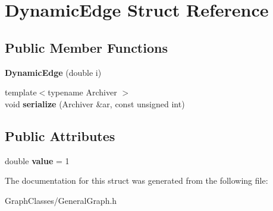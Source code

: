 \hypertarget{structDynamicEdge}{}\section{Dynamic\+Edge Struct Reference}
\label{structDynamicEdge}
\subsection*{Public Member Functions}
\begin{DoxyCompactItemize}
\item 
\mbox{\label{structDynamicEdge_ac6924c98f001d82ba565c9fedd2e3c87}} 
{\bfseries Dynamic\+Edge} (double i)
\item 
\mbox{\label{structDynamicEdge_a685fb1ed1035f87f7095f64a9746202f}} 
{\footnotesize template$<$typename Archiver $>$ }\\void {\bfseries serialize} (Archiver \&ar, const unsigned int)
\end{DoxyCompactItemize}
\subsection*{Public Attributes}
\begin{DoxyCompactItemize}
\item 
\mbox{\label{structDynamicEdge_a8131459b38901852752f787e42c991aa}} 
double {\bfseries value} = 1
\end{DoxyCompactItemize}


The documentation for this struct was generated from the following file\+:\begin{DoxyCompactItemize}
\item 
Graph\+Classes/General\+Graph.\+h\end{DoxyCompactItemize}
